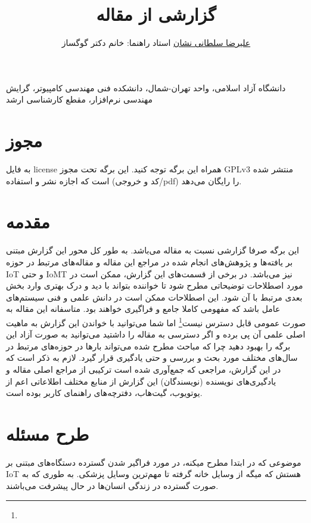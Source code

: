 \documentclass[10pt, a4paper]{article}
\title{گزارشی از مقاله \lr{Reliable Real-Time Operating System for IoT Devices}}
\author{\href{mailto:a.soltani@iau-tnb.ac.ir}{علیرضا سلطانی نشان} \small{استاد
راهنما: خانم دکتر گوگساز}}
\begin{document}
\maketitle

دانشگاه آزاد اسلامی، واحد تهران-شمال، دانشکده فنی مهندسی کامپیوتر، گرایش مهندسی
نرم‌افزار، مقطع کارشناسی ارشد

\tableofcontents

\section{مجوز}

به فایل license همراه این برگه توجه کنید. این برگه تحت مجوز GPLv3 منتشر شده است
که اجازه نشر و استفاده (کد و خروجی/pdf) را رایگان می‌دهد.

\section{مقدمه}

این برگه صرفا گزارشی نسبت به مقاله  می‌باشد. به طور کل محور این گزارش مبتنی بر یافته‌ها و پژوهش‌های
انجام شده در مراجع این مقاله و مقاله‌های مرتبط در حوزه IoT و حتی IoMT نیز
می‌باشد. در برخی از قسمت‌های این گزارش، ممکن است در مورد اصطلاحات توضیحاتی مطرح
شود تا خواننده بتواند با دید و درک بهتری وارد بخش بعدی مرتبط با آن شود. این
اصطلاحات ممکن است در دانش علمی و فنی سیستم‌های عامل باشد که مفهومی کاملا جامع و
فراگیری خواهند بود. متاسفانه این مقاله به صورت عمومی قابل دسترس
نیست\footnote{} اما شما می‌توانید با خواندن این گزارش به ماهیت
اصلی علمی آن پی برده و اگر دسترسی به مقاله را داشتید می‌توانید به صورت آزاد این
برگه را بهبود دهید چرا که مباحث مطرح شده می‌تواند بار‌ها در حوزه‌های مرتبط در
سال‌های مختلف مورد بحث و بررسی و حتی یادگیری قرار گیرد. لازم به ذکر است که در
این گزارش، مراجعی که جمع‌آوری شده است ترکیبی از مراجع اصلی مقاله و یادگیری‌های
نویسنده (نویسندگان) این گزارش از منابع مختلف اطلاعاتی اعم از یوتویوب، گیت‌هاب،
دفترچه‌های راهنمای کاربر بوده است.

\section{طرح مسئله}

موضوعی که در ابتدا مطرح میکنه، در مورد فراگیر شدن گسترده دستگاه‌های مبتنی بر IoT
هستش که میگه از وسایل خانه گرفته تا مهم‌ترین وسایل پزشکی. به طوری که به صورت
گسترده در زندگی انسان‌ها در حال پیشرفت می‌باشند. 
\end{document}
